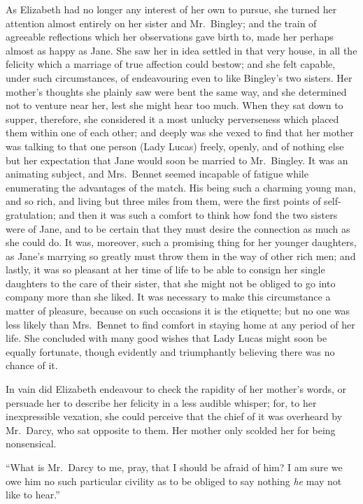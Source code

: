 \documentclass[12pt,english,oneside]{book}
\begin{document}
As Elizabeth had no longer any interest of her own to pursue, she
turned her attention almost entirely on her sister and Mr.\ Bingley;
and the train of agreeable reflections which her observations gave
birth to, made her perhaps almost as happy as Jane. She saw her in
idea settled in that very house, in all the felicity which a marriage
of true affection could bestow; and she felt capable, under such circumstances,
of endeavouring even to like Bingley's two sisters. Her mother's thoughts
she plainly saw were bent the same way, and she determined not to
venture near her, lest she might hear too much. When they sat down
to supper, therefore, she considered it a most unlucky perverseness
which placed them within one of each other; and deeply was she vexed
to find that her mother was talking to that one person (Lady Lucas)
freely, openly, and of nothing else but her expectation that Jane
would soon be married to Mr.\ Bingley. It was an animating subject,
and Mrs.\ Bennet seemed incapable of fatigue while enumerating the
advantages of the match. His being such a charming young man, and
so rich, and living but three miles from them, were the first points
of self-gratulation; and then it was such a comfort to think how fond
the two sisters were of Jane, and to be certain that they must desire
the connection as much as she could do. It was, moreover, such a promising
thing for her younger daughters, as Jane's marrying so greatly must
throw them in the way of other rich men; and lastly, it was so pleasant
at her time of life to be able to consign her single daughters to
the care of their sister, that she might not be obliged to go into
company more than she liked. It was necessary to make this circumstance
a matter of pleasure, because on such occasions it is the etiquette;
but no one was less likely than Mrs.\ Bennet to find comfort in staying
home at any period of her life. She concluded with many good wishes
that Lady Lucas might soon be equally fortunate, though evidently
and triumphantly believing there was no chance of it.

In vain did Elizabeth endeavour to check the rapidity of her mother's
words, or persuade her to describe her felicity in a less audible
whisper; for, to her inexpressible vexation, she could perceive that
the chief of it was overheard by Mr.\ Darcy, who sat opposite to
them. Her mother only scolded her for being nonsensical.

{}``What is Mr.\ Darcy to me, pray, that I should be afraid of him?
I am sure we owe him no such particular civility as to be obliged
to say nothing \textit{he} may not like to hear.''
\end{document}

